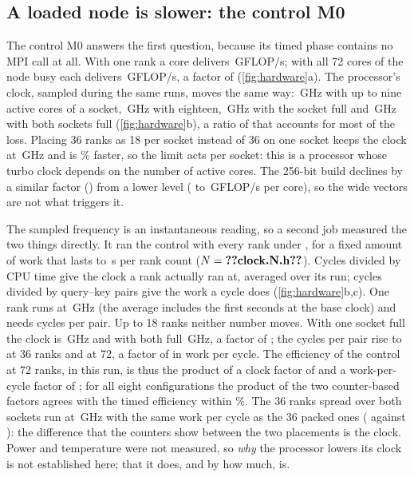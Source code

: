 \subsection{A loaded node is slower: the control M0}\label{sec:hardware}
The control M0 answers the first question, because its timed phase contains no MPI
call at all. With one rank a core delivers \,GFLOP/s; with all 72
cores of the node busy each delivers \,GFLOP/s, a factor of
 (\cref{fig:hardware}a). The processor's clock, sampled during the
same runs, moves the same way: \,GHz with up to nine active cores of a
socket, \,GHz with eighteen, \,GHz with the socket full
and \,GHz with both sockets full (\cref{fig:hardware}b), a ratio of
 that accounts for most of the loss. Placing 36 ranks as 18 per
socket instead of 36 on one socket keeps the clock at \,GHz and
is \% faster, so the limit acts per socket: this is a processor
whose turbo clock depends on the number of active cores. The 256-bit build
declines by a similar factor () from a lower level
( to \,GFLOP/s per core), so the wide
vectors are not what triggers it.

The sampled frequency is an instantaneous reading, so a second job measured the
two things directly. It ran the control with every rank under , for
a fixed amount of work that lasts  to \,s
per rank count ($N=\n{clock.N.h}$). Cycles divided by CPU time give the clock a
rank actually ran at, averaged over its run; cycles divided by query--key pairs
give the work a cycle does (\cref{fig:hardware}b,c). One rank runs at
\,GHz (the average includes the first seconds at the base clock) and
needs  cycles per pair. Up to 18 ranks neither number moves. With one
socket full the clock is \,GHz and with both full
\,GHz, a factor of ; the cycles per pair rise to
 at 36 ranks and  at 72, a factor of
 in work per cycle. The efficiency of the control at 72 ranks,
 in this run, is thus the product of a clock factor of
 and a work-per-cycle factor of ; for all
eight configurations the product of the two counter-based factors agrees with the
timed efficiency within \%. The 36 ranks spread over both
sockets run at \,GHz with the same work per cycle as the 36
packed ones ( against ): the
difference that the counters show between the two placements is the clock. Power
and temperature were not measured, so
\emph{why} the processor lowers its clock is not established here; that it does,
and by how much, is.


